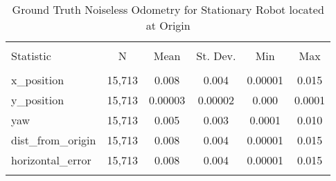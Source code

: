 
\begin{table}[h] \centering 
  \caption{Ground Truth Noiseless Odometry for Stationary Robot located at Origin} 
  \label{tab:gazebo_stationary_noiseless_summary} 
\begin{tabular}{@{\extracolsep{5pt}}lccccc} 
\\[-1.8ex]\hline 
\hline \\[-1.8ex] 
Statistic & \multicolumn{1}{c}{N} & \multicolumn{1}{c}{Mean} & \multicolumn{1}{c}{St. Dev.} & \multicolumn{1}{c}{Min} & \multicolumn{1}{c}{Max} \\ 
\hline \\[-1.8ex] 
x\_position & 15,713 & 0.008 & 0.004 & 0.00001 & 0.015 \\ 
y\_position & 15,713 & 0.00003 & 0.00002 & 0.000 & 0.0001 \\ 
yaw & 15,713 & 0.005 & 0.003 & 0.0001 & 0.010 \\ 
dist\_from\_origin & 15,713 & 0.008 & 0.004 & 0.00001 & 0.015 \\ 
horizontal\_error & 15,713 & 0.008 & 0.004 & 0.00001 & 0.015 \\ 
\hline \\[-1.8ex] 
\end{tabular} 
\end{table} 
